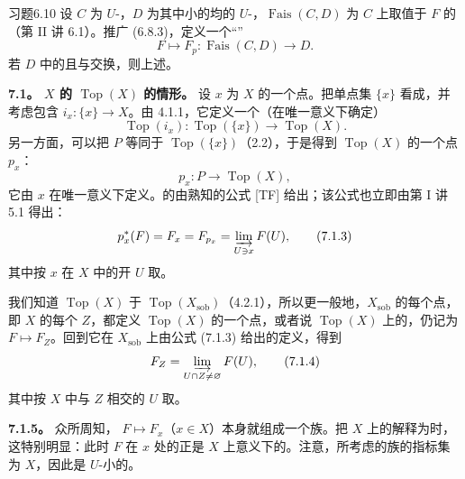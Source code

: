 \begin{SGAresult}{习题}{6.10}
设 $C$ 为 $U$-，$D$ 为其中小的均的 $U$-，$\operatorname{Fais}(C,D)$ 为 $C$ 上取值于 $F$ 的（第 II 讲 6.1）。推广 (6.8.3)，定义一个“”
\[F\longmapsto F_p:\operatorname{Fais}(C,D)\longrightarrow D.\tag{6.10.1}\]
若 $D$ 中的且与交换，则上述。
\end{SGAresult}

\textbf{7.1。 $X$ 的 $\operatorname{Top}(X)$ 的情形。} 设 $x$ 为 $X$ 的一个点。把单点集 $\{x\}$ 看成，并考虑包含 $i_x:\{x\}\to X$。由 4.1.1，它定义一个（在唯一意义下确定）
\[\operatorname{Top}(i_x):\operatorname{Top}(\{x\})\longrightarrow\operatorname{Top}(X).\tag{7.1.1}\]
另一方面，可以把 $P$ 等同于 $\operatorname{Top}(\{x\})$（2.2），于是得到 $\operatorname{Top}(X)$ 的一个点 $p_x$：
\[p_x:P\longrightarrow\operatorname{Top}(X),\tag{7.1.2}\]
它由 $x$ 在唯一意义下定义。的由熟知的公式 [TF] 给出；该公式也立即由第 I 讲 5.1 得出：
\[p_x^*(F)=F_x=F_{p_x}=\varinjlim_{U\ni x}F(U),\tag{7.1.3}\]
其中按 $x$ 在 $X$ 中的开 $U$ 取。

我们知道 $\operatorname{Top}(X)$ 于 $\operatorname{Top}(X_{\mathrm{sob}})$（4.2.1），所以更一般地，$X_{\mathrm{sob}}$ 的每个点，即 $X$ 的每个 $Z$，都定义 $\operatorname{Top}(X)$ 的一个点，或者说 $\operatorname{Top}(X)$ 上的，仍记为 $F\mapsto F_Z$。回到它在 $X_{\mathrm{sob}}$ 上由公式 (7.1.3) 给出的定义，得到
\[F_Z=\varinjlim_{U\cap Z\ne\varnothing}F(U),\tag{7.1.4}\]
其中按 $X$ 中与 $Z$ 相交的 $U$ 取。

\textbf{7.1.5。} 众所周知， $F\mapsto F_x$（$x\in X$）本身就组成一个族。把 $X$ 上的解释为时，这特别明显：此时 $F$ 在 $x$ 处的正是 $X$ 上意义下的。注意，所考虑的族的指标集为 $X$，因此是 $U$-小的。


